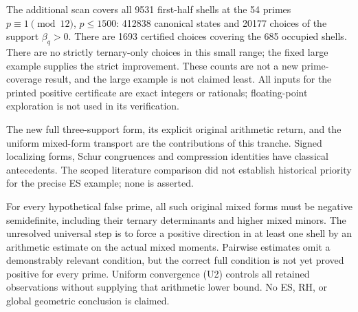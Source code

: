 The additional scan covers all 9531 first-half shells at the 54 primes
$p\equiv1\pmod{12}$, $p\le1500$: 412838 canonical states and 20177 choices
of the support $\beta_q>0$. There are 1693 certified choices covering the
685 occupied shells. There are no strictly ternary-only choices in this small
range; the fixed large example supplies the strict improvement. These counts
are not a new prime-coverage result, and the large example is not claimed least.
All inputs for the printed positive certificate are exact integers or rationals;
floating-point exploration is not used in its verification.

The new full three-support form, its explicit original arithmetic return, and
the uniform mixed-form transport are the contributions of this tranche.
Signed localizing forms, Schur congruences and compression identities have
classical antecedents. The scoped literature comparison did not establish
historical priority for the precise ES example; none is asserted.

For every hypothetical false prime, all such original mixed forms must be
negative semidefinite, including their ternary determinants and higher mixed
minors. The unresolved universal step is to force a positive direction in at
least one shell by an arithmetic estimate on the actual mixed moments.
Pairwise estimates omit a demonstrably relevant condition, but the correct
full condition is not yet proved positive for every prime. Uniform convergence
(U2) controls all retained observations without supplying that arithmetic
lower bound. No ES, RH, or global geometric conclusion is claimed.
